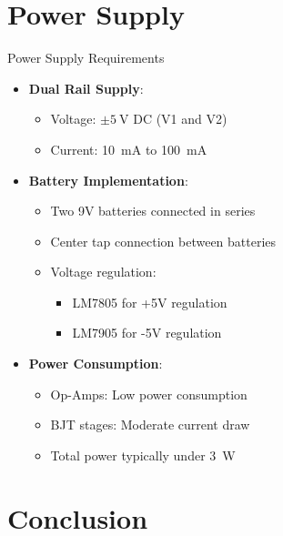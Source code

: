 \documentclass[10pt,xcolor={table,dvipsnames},t]{beamer}
\begin{document}
\section{Power Supply}
\begin{frame}{Power Supply Requirements}
\begin{itemize}
    \item \textbf{Dual Rail Supply}:
    \begin{itemize}
        \item Voltage: $\pm \SI{5}{\volt}$ DC (V1 and V2)
        \item Current: \SI{10}{\milli\ampere} to \SI{100}{\milli\ampere}
    \end{itemize}
    
    \item \textbf{Battery Implementation}:
    \begin{itemize}
        \item Two 9V batteries connected in series
        \item Center tap connection between batteries
        \item Voltage regulation:
            \begin{itemize}
                \item LM7805 for +5V regulation
                \item LM7905 for -5V regulation
            \end{itemize}
    \end{itemize}
    
    \item \textbf{Power Consumption}:
    \begin{itemize}
        \item Op-Amps: Low power consumption
        \item BJT stages: Moderate current draw
        \item Total power typically under \SI{3}{\watt}
    \end{itemize}
\end{itemize}
\end{frame}

\section{Conclusion}
\end{document}
